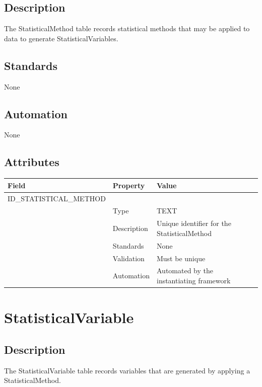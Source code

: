 \subsection{Description}\label{description-29}

The StatisticalMethod table records statistical methods that may be
applied to data to generate StatisticalVariables.

\subsection{Standards}\label{standards-31}

None

\subsection{Automation}\label{automation-31}

None

\subsection{Attributes}\label{attributes-26}

\begin{longtable}[]{@{}lll@{}}
\toprule\noalign{}
Field & Property & Value \\
\midrule\noalign{}
\endhead
\bottomrule\noalign{}
\endlastfoot
ID\_STATISTICAL\_METHOD & & \\
& Type & TEXT \\
& Description & Unique identifier for the StatisticalMethod \\
& Standards & None \\
& Validation & Must be unique \\
& Automation & Automated by the instantiating framework \\
\end{longtable}

\section{StatisticalVariable}\label{statisticalvariable}

\subsection{Description}\label{description-30}

The StatisticalVariable table records variables that are generated by
applying a StatisticalMethod.

